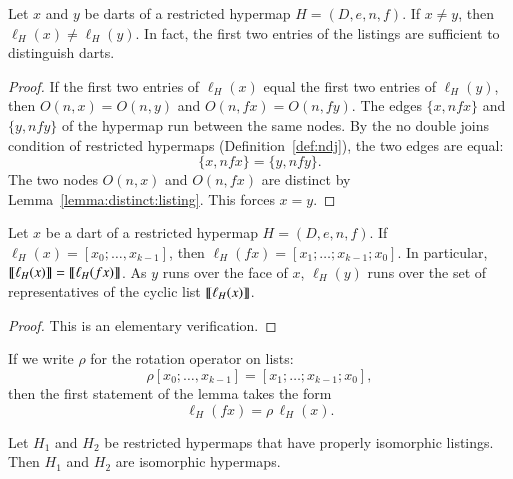 \begin{lemma}\label{lemma:list-u}
  Let $x$ and $y$ be darts of a restricted hypermap $H=(D,e,n,f)$.  If
  $x\ne y$, then $\ell_H(x)\ne \ell_H(y)$.  In fact, the first two
  entries of the listings are sufficient to distinguish darts.
\end{lemma}

\begin{proof}
  If the first two entries of $\ell_H(x)$ equal the first two entries
  of $\ell_H(y)$, then $O(n,x)=O(n,y)$ and $O(n,fx) = O(n,fy)$.  The
  edges $\{x,n f x\}$ and $\{y, n f y\}$ of the hypermap run between
  the same nodes.  By the no double joins condition of restricted
  hypermaps (Definition~\ref{def:ndj}), the two edges are equal:
\[
\{x,n f x\} = \{y, n f y\}.
\]
The two nodes $O(n,x)$ and $O(n,f x)$ are distinct by Lemma~\ref{lemma:distinct:listing}.  This forces $x=y$.
\end{proof}

\begin{lemma}\label{lemma:f-equi}
  Let $x$ be a dart of a restricted hypermap $H=(D,e,n,f)$.  If
  $\ell_H(x) = [x_0;\ldots,x_{k-1}]$, then $\ell_H(f x) =
  [x_1;\ldots;x_{k-1};x_0]$.  In particular,
  ${\llbracket{\ell_H(x)}\rrbracket}={\llbracket{\ell_H(f x)}\rrbracket}$.  As $y$ runs over the face of
  $x$, $\ell_H(y)$ runs over the set of representatives of the cyclic
  list ${\llbracket{\ell_H(x)}\rrbracket}$.
\end{lemma}

\begin{proof} This is an elementary verification.
\end{proof}

If we write $\rho$ for the rotation operator on lists:
\[
\rho  [x_0;\ldots,x_{k-1}]= [x_1;\ldots;x_{k-1};x_0],
\]
then the first statement of the lemma takes the form
\[
 \ell_H(f x) = \rho\, \ell_H(x).
\]
%

\begin{lemma}\label{lemma:pr-iso} 
  Let $H_1$ and $H_2$ be restricted hypermaps that have properly
  isomorphic listings.  Then $H_1$ and $H_2$ are isomorphic hypermaps.
\end{lemma}

